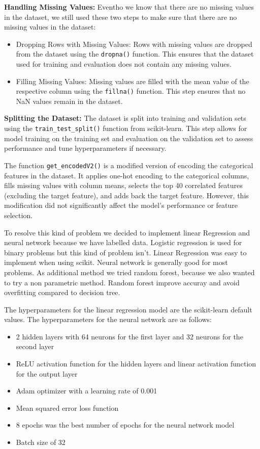 \documentclass[a4, 10 pt, conference]{ieeeconf}  %
\begin{document}
\textbf{Handling Missing Values:} Eventho we know that there are no missing values in the dataset, we still used these two steps to make sure that there are no missing values in the dataset:
\begin{itemize}
  \item Dropping Rows with Missing Values: Rows with missing values are dropped from the dataset using the \texttt{dropna()} function. This ensures that the dataset used for training and evaluation does not contain any missing values.
  \item Filling Missing Values: Missing values are filled with the mean value of the respective column using the \texttt{fillna()} function. This step ensures that no NaN values remain in the dataset.
\end{itemize}

\textbf{Splitting the Dataset:} The dataset is split into training and validation sets using the \texttt{train\_test\_split()} function from scikit-learn. This step allows for model training on the training set and evaluation on the validation set to assess performance and tune hyperparameters if necessary.

The function \texttt{get\_encodedV2()} is a modified version of encoding the categorical features in the dataset. It applies one-hot encoding to the categorical columns, fills missing values with column means, selects the top 40 correlated features (excluding the target feature), and adds back the target feature. However, this modification did not significantly affect the model's performance or feature selection.

To resolve this kind of problem we decided to implement linear Regression and neural network because we have labelled data. Logistic regression is used for binary problems but this kind of problem isn't. Linear Regression was easy to implement when using scikit. Neural network is generally good for most problems.
As additional method we tried random forest, because we also wanted to try a non parametric method. Random forest improve accuray and avoid overfitting compared to decision tree.

The hyperparameters for the linear regression model are the scikit-learn default values. The hyperparameters for the neural network are as follows:
\begin{itemize}
  \item2 hidden layers with 64 neurons for the first layer and 32 neurons for the second layer
  \item ReLU activation function for the hidden layers and linear activation function for the output layer
  \item Adam optimizer with a learning rate of 0.001
  \item Mean squared error loss function
  \item 8 epochs was the best number of epochs for the neural network model
  \item Batch size of 32
\end{itemize}
\end{document}
